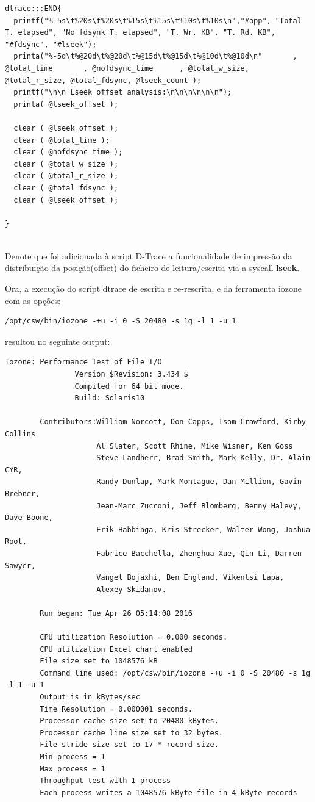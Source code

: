 \documentclass[a4paper]{article}
\begin{document}
{\begin{lstlisting}
dtrace:::END{
  printf("%-5s\t%20s\t%20s\t%15s\t%15s\t%10s\t%10s\n","#opp", "Total T. elapsed", "No fdsynk T. elapsed", "T. Wr. KB", "T. Rd. KB", "#fdsync", "#lseek");
  printa("%-5d\t%@20d\t%@20d\t%@15d\t%@15d\t%@10d\t%@10d\n"       , @total_time       , @nofdsync_time      , @total_w_size, @total_r_size, @total_fdsync, @lseek_count );
  printf("\n\n Lseek offset analysis:\n\n\n\n\n\n");
  printa( @lseek_offset );

  clear ( @lseek_offset );
  clear ( @total_time );
  clear ( @nofdsync_time );
  clear ( @total_w_size );
  clear ( @total_r_size );
  clear ( @total_fdsync );
  clear ( @lseek_offset );

}


\end{lstlisting}

Denote que foi adicionada à script D-Trace a funcionalidade de impressão da distribuição da posição(offset) do ficheiro de leitura/escrita via a syscall \textbf{lseek}. 

Ora, a execução do script dtrace de escrita e re-rescrita, e da ferramenta iozone com as opções:

\begin{lstlisting}[style=command]
/opt/csw/bin/iozone -+u -i 0 -S 20480 -s 1g -l 1 -u 1
\end{lstlisting}

 resultou no seguinte output:

\begin{lstlisting}[style=output]
        Iozone: Performance Test of File I/O
                Version $Revision: 3.434 $
                Compiled for 64 bit mode.
                Build: Solaris10 

        Contributors:William Norcott, Don Capps, Isom Crawford, Kirby Collins
                     Al Slater, Scott Rhine, Mike Wisner, Ken Goss
                     Steve Landherr, Brad Smith, Mark Kelly, Dr. Alain CYR,
                     Randy Dunlap, Mark Montague, Dan Million, Gavin Brebner,
                     Jean-Marc Zucconi, Jeff Blomberg, Benny Halevy, Dave Boone,
                     Erik Habbinga, Kris Strecker, Walter Wong, Joshua Root,
                     Fabrice Bacchella, Zhenghua Xue, Qin Li, Darren Sawyer,
                     Vangel Bojaxhi, Ben England, Vikentsi Lapa,
                     Alexey Skidanov.

        Run began: Tue Apr 26 05:14:08 2016

        CPU utilization Resolution = 0.000 seconds.
        CPU utilization Excel chart enabled
        File size set to 1048576 kB
        Command line used: /opt/csw/bin/iozone -+u -i 0 -S 20480 -s 1g -l 1 -u 1
        Output is in kBytes/sec
        Time Resolution = 0.000001 seconds.
        Processor cache size set to 20480 kBytes.
        Processor cache line size set to 32 bytes.
        File stride size set to 17 * record size.
        Min process = 1 
        Max process = 1 
        Throughput test with 1 process
        Each process writes a 1048576 kByte file in 4 kByte records


\end{lstlisting}}
\end{document}
